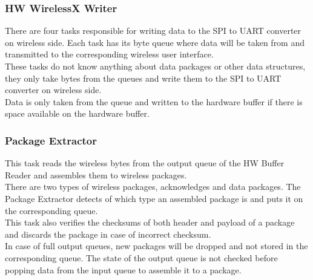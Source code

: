 \subsubsection{HW WirelessX Writer}
There are four tasks responsible for writing data to the SPI to UART converter on wireless side. Each task has its byte queue where data will be taken from and transmitted to the corresponding wireless user interface. \\
These tasks do not know anything about data packages or other data structures, they only take bytes from the queues and write them to the SPI to UART converter on wireless side. \\
Data is only taken from the queue and written to the hardware buffer if there is space available on the hardware buffer.
\subsubsection{Package Extractor}
This task reads the wireless bytes from the output queue of the HW Buffer Reader and assembles them to wireless packages.\\
There are two types of wireless packages, acknowledges and data packages. The Package Extractor detects of which type an assembled package is and puts it on the corresponding queue.\\
This task also verifies the checksums of both header and payload of a package and discards the package in case of incorrect checksum. \\
In case of full output queues, new packages will be dropped and not stored in the corresponding queue. The state of the output queue is not checked before popping data from the input queue to assemble it to a package.
